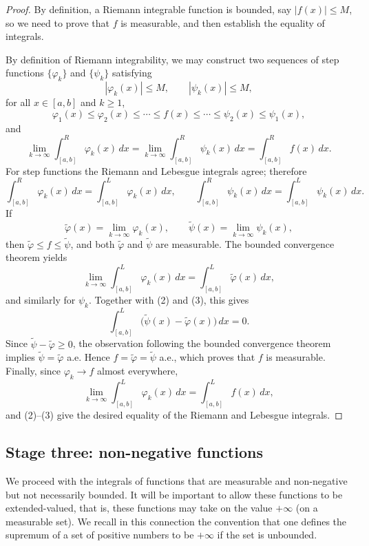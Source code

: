 \documentclass[11pt,openany]{book}
\begin{document}
\begin{proof}
By definition, a Riemann integrable function is bounded, say $|f(x)|\leq M$, so we need to prove that $f$ is measurable, and then establish the equality of integrals.

By definition of Riemann integrability, we may construct two sequences of step functions $\{\varphi_k\}$ and $\{\psi_k\}$ satisfying
\[
|\varphi_k(x)|\leq M,\qquad |\psi_k(x)|\leq M,
\]
for all $x\in[a,b]$ and $k\geq1$,
\[
\varphi_1(x)\leq\varphi_2(x)\leq\cdots\leq f(x)
\leq\cdots\leq\psi_2(x)\leq\psi_1(x),
\]
and
\begin{equation}
\lim_{k\to\infty}\int_{[a,b]}^{R}\varphi_k(x)\,dx
=\lim_{k\to\infty}\int_{[a,b]}^{R}\psi_k(x)\,dx
=\int_{[a,b]}^{R}f(x)\,dx.
\tag{2}
\end{equation}
For step functions the Riemann and Lebesgue integrals agree; therefore
\begin{equation}
\int_{[a,b]}^{R}\varphi_k(x)\,dx
=\int_{[a,b]}^{L}\varphi_k(x)\,dx,
\qquad
\int_{[a,b]}^{R}\psi_k(x)\,dx
=\int_{[a,b]}^{L}\psi_k(x)\,dx.
\tag{3}
\end{equation}
If
\[
\widetilde\varphi(x)=\lim_{k\to\infty}\varphi_k(x),
\qquad
\widetilde\psi(x)=\lim_{k\to\infty}\psi_k(x),
\]
then $\widetilde\varphi\leq f\leq\widetilde\psi$, and both $\widetilde\varphi$ and $\widetilde\psi$ are measurable. The bounded convergence theorem yields
\[
\lim_{k\to\infty}\int_{[a,b]}^{L}\varphi_k(x)\,dx
=\int_{[a,b]}^{L}\widetilde\varphi(x)\,dx,
\]
and similarly for $\psi_k$. Together with (2) and (3), this gives
\[
\int_{[a,b]}^{L}\bigl(\widetilde\psi(x)-\widetilde\varphi(x)\bigr)\,dx=0.
\]
Since $\widetilde\psi-\widetilde\varphi\geq0$, the observation following the bounded convergence theorem implies $\widetilde\psi=\widetilde\varphi$ a.e. Hence $f=\widetilde\varphi=\widetilde\psi$ a.e., which proves that $f$ is measurable. Finally, since $\varphi_k\to f$ almost everywhere,
\[
\lim_{k\to\infty}\int_{[a,b]}^{L}\varphi_k(x)\,dx
=\int_{[a,b]}^{L}f(x)\,dx,
\]
and (2)--(3) give the desired equality of the Riemann and Lebesgue integrals.
\end{proof}

\subsection*{Stage three: non-negative functions}

We proceed with the integrals of functions that are measurable and non-negative but not necessarily bounded. It will be important to allow these functions to be extended-valued, that is, these functions may take on the value $+\infty$ (on a measurable set). We recall in this connection the convention that one defines the supremum of a set of positive numbers to be $+\infty$ if the set is unbounded.
\end{document}
